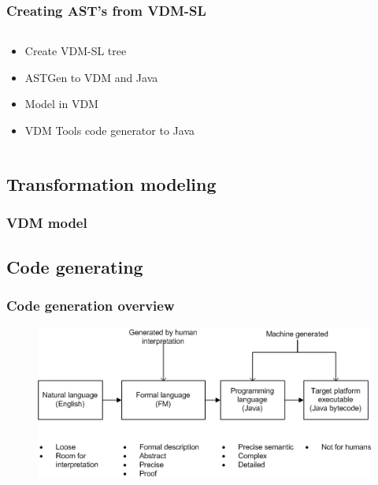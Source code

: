 %
%
\frame
{
  \frametitle{Creating AST's from VDM-SL}
\begin{center}



\begin{columns}
\begin{column}[l]{4cm}

  \begin{itemize}
  		\item Create VDM-SL tree
  		\item ASTGen to VDM and Java
  		\item Model in VDM
  		\item VDM Tools code generator to Java
  \end{itemize}

\end{column}
\begin{column}[r]{6cm}



\end{column}
\end{columns}


\end{center}
}


\subsection{Transformation modeling}

%
%
\frame
{
  \frametitle{VDM model}
\begin{center}





\end{center}
}

\subsection{Code generating}


%
%
\frame
{
  \frametitle{Code generation overview}

\begin{center}

\begin{figure}

\includegraphics[width=\textwidth]{images/codegenneration.png}

\end{figure}

\end{center}
}
